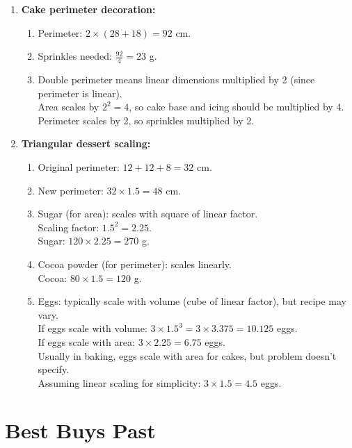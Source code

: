 \documentclass[12pt]{article}
\begin{document}
\begin{enumerate}[resume]
    \item \textbf{Cake perimeter decoration:}
    \begin{enumerate}
        \item Perimeter: \( 2 \times (28 + 18) = 92\) cm.
        \item Sprinkles needed: \( \frac{92}{4} = 23\) g.
        \item Double perimeter means linear dimensions multiplied by 2 (since perimeter is linear). \\
        Area scales by \( 2^2 = 4 \), so cake base and icing should be multiplied by 4. \\
        Perimeter scales by 2, so sprinkles multiplied by 2.
    \end{enumerate}

    \item \textbf{Triangular dessert scaling:}
    \begin{enumerate}
        \item Original perimeter: \( 12 + 12 + 8 = 32\) cm.
        \item New perimeter: \( 32 \times 1.5 = 48\) cm.
        \item Sugar (for area): scales with square of linear factor. \\
        Scaling factor: \( 1.5^2 = 2.25 \). \\
        Sugar: \( 120 \times 2.25 = 270\) g.
        \item Cocoa powder (for perimeter): scales linearly. \\
        Cocoa: \( 80 \times 1.5 = 120\) g.
        \item Eggs: typically scale with volume (cube of linear factor), but recipe may vary. \\
        If eggs scale with volume: \( 3 \times 1.5^3 = 3 \times 3.375 = 10.125\) eggs. \\
        If eggs scale with area: \( 3 \times 2.25 = 6.75\) eggs. \\
        Usually in baking, eggs scale with area for cakes, but problem doesn't specify. \\
        Assuming linear scaling for simplicity: \( 3 \times 1.5 = 4.5\) eggs.
    \end{enumerate}
\end{enumerate}

\section*{Best Buys Past}
\end{document}
